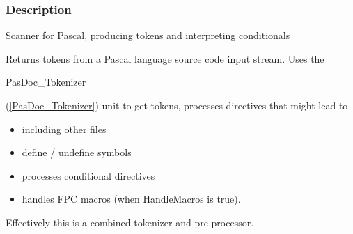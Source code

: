 \documentclass{report}
\begin{document}
\subsubsection*{\large{\textbf{Description}}\normalsize\hspace{1ex}\hfill}
Scanner for Pascal, producing tokens and interpreting conditionals

Returns tokens from a Pascal language source code input stream. Uses the \begin{ttfamily}PasDoc{\_}Tokenizer\end{ttfamily}(\ref{PasDoc_Tokenizer}) unit to get tokens, processes directives that might lead to

\begin{itemize}
\item including other files
\item define / undefine symbols
\item processes conditional directives
\item handles FPC macros (when HandleMacros is true).
\end{itemize}

Effectively this is a combined tokenizer and pre{-}processor.
\end{document}
